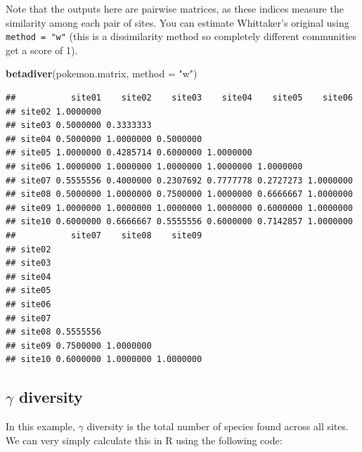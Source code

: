 \documentclass[]{book}
\newenvironment{Shaded}{\begin{snugshade}}{\end{snugshade}}
\newcommand{\KeywordTok}[1]{\textcolor[rgb]{0.13,0.29,0.53}{\textbf{{#1}}}}
\newcommand{\DataTypeTok}[1]{\textcolor[rgb]{0.13,0.29,0.53}{{#1}}}
\newcommand{\StringTok}[1]{\textcolor[rgb]{0.31,0.60,0.02}{{#1}}}
\newcommand{\NormalTok}[1]{{#1}}
\theoremstyle{definition}
\theoremstyle{definition}
\theoremstyle{definition}
\theoremstyle{remark}
\begin{document}
Note that the outputs here are pairwise matrices, as these indices
measure the similarity among each pair of sites. You can estimate
Whittaker's original using \texttt{method\ =\ "w"} (this is a
dissimilarity method so completely different communities get a score of
1).

\begin{Shaded}
\begin{Highlighting}[]
\KeywordTok{betadiver}\NormalTok{(pokemon.matrix, }\DataTypeTok{method =} \StringTok{"w"}\NormalTok{)}
\end{Highlighting}
\end{Shaded}

\begin{verbatim}
##           site01    site02    site03    site04    site05    site06
## site02 1.0000000                                                  
## site03 0.5000000 0.3333333                                        
## site04 0.5000000 1.0000000 0.5000000                              
## site05 1.0000000 0.4285714 0.6000000 1.0000000                    
## site06 1.0000000 1.0000000 1.0000000 1.0000000 1.0000000          
## site07 0.5555556 0.4000000 0.2307692 0.7777778 0.2727273 1.0000000
## site08 0.5000000 1.0000000 0.7500000 1.0000000 0.6666667 1.0000000
## site09 1.0000000 1.0000000 1.0000000 1.0000000 0.6000000 1.0000000
## site10 0.6000000 0.6666667 0.5555556 0.6000000 0.7142857 1.0000000
##           site07    site08    site09
## site02                              
## site03                              
## site04                              
## site05                              
## site06                              
## site07                              
## site08 0.5555556                    
## site09 0.7500000 1.0000000          
## site10 0.6000000 1.0000000 1.0000000
\end{verbatim}

\subsection{\texorpdfstring{\(\gamma\)
diversity}{\textbackslash{}gamma diversity}}\label{gamma-diversity}

In this example, \(\gamma\) diversity is the total number of species
found across all sites. We can very simply calculate this in R using the
following code:

\begin{Shaded}
\end{Shaded}
\end{document}
